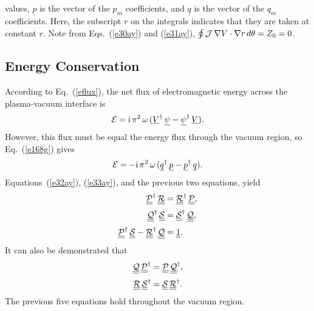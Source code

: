 \documentclass[12pt,prb,aps,notitlepage]{revtex4-1}
\begin{document}
values, $\underline{p}$ is the vector of the $p_m$ coefficients, and  $\underline{q}$ is the vector of the $q_m$ coefficients. Here, the
subscript $r$ on the integrals indicates that they are taken at constant $r$. 
Note from Eqs.~(\ref{e30ay}) and (\ref{e31ay}), $\oint {\cal J}\,\nabla V\cdot\nabla r\,d\theta=Z_0=0$. 

\subsection{Energy Conservation}
According to Eq.~(\ref{eflux}), the net flux of electromagnetic energy across the plasma-vacuum interface  is
\begin{equation}
{\cal E} = {\rm i}\,\pi^2\,\omega\, (\underline{V}^\dag\,\underline{\psi}- \underline{\psi}^\dag\,\underline{V}).
\end{equation}
However, this flux must be equal the energy flux through the vacuum region, so Eq.~(\ref{e168g}) gives
\begin{equation}\label{e39x}
{\cal E} =-  {\rm i}\,\pi^2\,\omega\,(\underline{q}^\dag\,\underline{p}-\underline{p}^\dag\,\underline{q}).
\end{equation}
Equations~(\ref{e32ay}), (\ref{e33ay}), and the previous two equations, yield 
\begin{align}\label{e41zx}
\underline{\underline{\cal P}}^\dag\,\underline{\underline{\cal R}}&= \underline{\underline{\cal R}}^\dag\,\underline{\underline{\cal P}},\\[0.5ex]
\underline{\underline{\cal Q}}^\dag\,\underline{\underline{\cal S}}&= \underline{\underline{\cal S}}^\dag\,\underline{\underline{\cal Q}},\label{e42zx}\\[0.5ex]
\underline{\underline{\cal P}}^\dag\,\underline{\underline{\cal S}}- \underline{\underline{\cal R}}^\dag\,\underline{\underline{\cal Q}}&=\underline{\underline{1}}.\label{e43zx}
\end{align}
 It can also be demonstrated that 
\begin{align}\label{e46}
\underline{\underline{\cal Q}}\,\underline{\underline{\cal P}}^\dag&= \underline{\underline{\cal P}}\,\underline{\underline{\cal Q}}^\dag,\\[0.5ex]
\underline{\underline{\cal R}}\,\underline{\underline{\cal S}}^\dag&= \underline{\underline{\cal S}}\,\underline{\underline{\cal R}}^\dag.\label{e47x}
\end{align}
The previous five equations hold throughout the vacuum region. 
\end{document}
